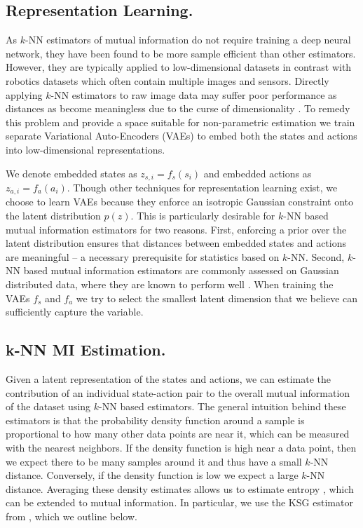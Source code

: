 \subsection{Representation Learning.} 
As $k$-NN estimators of mutual information do not require training a deep neural network, they have been found to be more sample efficient than other estimators. However, they are typically applied to low-dimensional datasets in contrast with robotics datasets which often contain multiple images and sensors. Directly applying $k$-NN estimators to raw image data may suffer poor performance as distances as become meaningless due to the curse of dimensionality \citep{curseofdim_knn}. To remedy this problem and provide a space suitable for non-parametric estimation we train separate Variational Auto-Encoders (VAEs) \citep{kingma2013auto} to embed both the states and actions into low-dimensional representations. 

We denote embedded states as $z_{s,i} = f_s(s_i)$ and embedded actions as $z_{a,i} = f_a(a_i)$. Though other techniques for representation learning exist, we choose to learn VAEs because they enforce an isotropic Gaussian constraint onto the latent distribution $p(z)$. This is particularly desirable for $k$-NN based mutual information estimators for two reasons. First, enforcing a prior over the latent distribution ensures that distances between embedded states and actions are meaningful -- a necessary prerequisite for statistics based on $k$-NN. Second, $k$-NN based mutual information estimators are commonly assessed on Gaussian distributed data, where they are known to perform well \citep{beyond-normal-2023}. When training the VAEs $f_s$ and $f_a$ we try to select the smallest latent dimension that we believe can sufficiently capture the variable. 

\subsection{k-NN MI Estimation.}
Given a latent representation of the states and actions, we can estimate the contribution of an individual state-action pair to the overall mutual information of the dataset using $k$-NN based estimators. The general intuition behind these estimators is that the probability density function around a sample is proportional to how many other data points are near it, which can be measured with the nearest neighbors. If the density function is high near a data point, then we expect there to be many samples around it and thus have a small $k$-NN distance. Conversely, if the density function is low we expect a large $k$-NN distance. Averaging these density estimates allows us to estimate entropy \citep{kozachenko1987sample}, which can be extended to mutual information. In particular, we use the KSG estimator from \citet{kraskov2004estimating}, which we outline below. 

